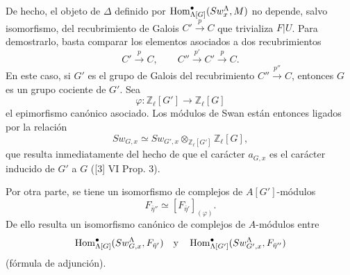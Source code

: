 De hecho, el objeto de $\Delta$ definido por $\operatorname{Hom}^\bullet_{\Lambda[G]}(Sw_x^\Lambda,M)$ no depende, salvo isomorfismo, del recubrimiento de Galois $C'\xrightarrow{p}C$ que trivializa $F|U$. Para demostrarlo, basta comparar los elementos asociados a dos recubrimientos
\[
C'\xrightarrow{p}C,\qquad C''\xrightarrow{p'}C'\xrightarrow{p}C.
\]
En este caso, si $G'$ es el grupo de Galois del recubrimiento $C''\xrightarrow{p''}C$, entonces $G$ es un grupo cociente de $G'$. Sea
\[
\varphi:\mathbb Z_\ell[G']\longrightarrow \mathbb Z_\ell[G]
\]
el epimorfismo canónico asociado. Los módulos de Swan están entonces ligados por la relación
\[
Sw_{G,x}\simeq Sw_{G',x}\otimes_{\mathbb Z_\ell[G']}\mathbb Z_\ell[G],
\]
que resulta inmediatamente del hecho de que el carácter $a_{G,x}$ es el carácter inducido de $G'$ a $G$ ([3] VI Prop. 3).

Por otra parte, se tiene un isomorfismo de complejos de $A[G']$-módulos
\[
F_{\bar\eta''}\simeq [F_{\bar\eta'}]_{(\varphi)}.
\]
De ello resulta un isomorfismo canónico de complejos de $A$-módulos entre
\[
\operatorname{Hom}^\bullet_{\Lambda[G]}(Sw_{G,x}^\Lambda,F_{\bar\eta'})
\quad\text{y}\quad
\operatorname{Hom}^\bullet_{\Lambda[G']}(Sw_{G',x}^\Lambda,F_{\bar\eta''})
\]
(fórmula de adjunción).
